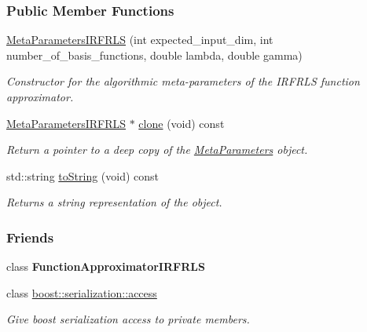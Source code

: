 \subsubsection*{Public Member Functions}
\begin{DoxyCompactItemize}
\item 
\hyperlink{classDmpBbo_1_1MetaParametersIRFRLS_a3db8bbd2524b2f2dcf3bfe4cd176ca8b}{Meta\+Parameters\+I\+R\+F\+R\+L\+S} (int expected\+\_\+input\+\_\+dim, int number\+\_\+of\+\_\+basis\+\_\+functions, double lambda, double gamma)
\begin{DoxyCompactList}\small\item\em Constructor for the algorithmic meta-\/parameters of the I\+R\+F\+R\+L\+S function approximator. \end{DoxyCompactList}\item 
\hyperlink{classDmpBbo_1_1MetaParametersIRFRLS}{Meta\+Parameters\+I\+R\+F\+R\+L\+S} $\ast$ \hyperlink{classDmpBbo_1_1MetaParametersIRFRLS_acd012b0dd9f75d7472a6f7bf3f6ecc2d}{clone} (void) const 
\begin{DoxyCompactList}\small\item\em Return a pointer to a deep copy of the \hyperlink{classDmpBbo_1_1MetaParameters}{Meta\+Parameters} object. \end{DoxyCompactList}\item 
std\+::string \hyperlink{classDmpBbo_1_1MetaParametersIRFRLS_a1aca816b42cf0d36118be0ab91120d77}{to\+String} (void) const 
\begin{DoxyCompactList}\small\item\em Returns a string representation of the object. \end{DoxyCompactList}\end{DoxyCompactItemize}
\subsubsection*{Friends}
\begin{DoxyCompactItemize}
\item 
\hypertarget{classDmpBbo_1_1MetaParametersIRFRLS_a66b3e6b2208ab42c25ea2b7a8ed35b22}{class {\bfseries Function\+Approximator\+I\+R\+F\+R\+L\+S}}\label{classDmpBbo_1_1MetaParametersIRFRLS_a66b3e6b2208ab42c25ea2b7a8ed35b22}

\item 
class \hyperlink{classDmpBbo_1_1MetaParametersIRFRLS_ac98d07dd8f7b70e16ccb9a01abf56b9c}{boost\+::serialization\+::access}
\begin{DoxyCompactList}\small\item\em Give boost serialization access to private members. \end{DoxyCompactList}\end{DoxyCompactItemize}
